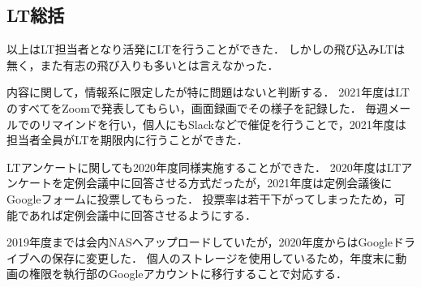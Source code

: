 \subsection*{LT総括}


\secondGrade{}以上はLT担当者となり活発にLTを行うことができた．
しかし\firstGrade{}の飛び込みLTは無く，また有志の飛び入りも多いとは言えなかった．

内容に関して，情報系に限定したが特に問題はないと判断する．
2021年度はLTのすべてをZoomで発表してもらい，画面録画でその様子を記録した．
毎週メールでのリマインドを行い，個人にもSlackなどで催促を行うことで，2021年度は担当者全員がLTを期限内に行うことができた．

LTアンケートに関しても2020年度同様実施することができた．
2020年度はLTアンケートを定例会議中に回答させる方式だったが，2021年度は定例会議後にGoogleフォームに投票してもらった．
投票率は若干下がってしまったため，可能であれば定例会議中に回答させるようにする．

2019年度までは会内NASへアップロードしていたが，2020年度からはGoogleドライブへの保存に変更した．
個人のストレージを使用しているため，年度末に動画の権限を執行部のGoogleアカウントに移行することで対応する．